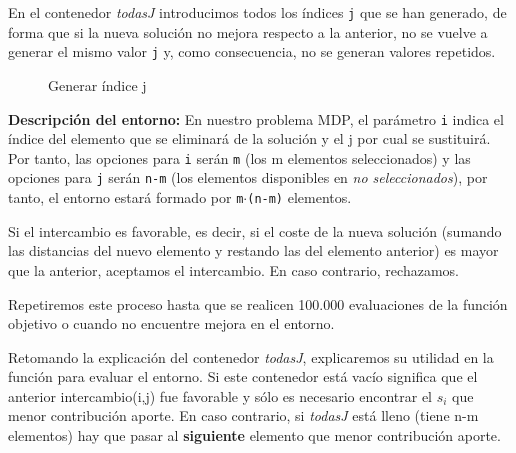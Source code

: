 \begin{enumerate}
	En el contenedor \textit{todasJ} introducimos todos los índices \texttt{j} que se han generado, de forma que si la nueva solución no mejora respecto a la anterior, no se vuelve a generar el mismo valor \texttt{j} y, como consecuencia, no se generan valores repetidos. 
	
	


\begin{figure}[H]
	\centering
	\begin{minipage}{.7\linewidth}
		
	\begin{algorithm}[H] 


		\caption{Generar índice j}
		\SetAlgoLined
		

		

	\end{algorithm}
		
	\end{minipage}
\end{figure}
	
	
	\newpage
	\textbf{Descripción del entorno:} 
	En nuestro problema MDP, el parámetro \texttt{i} indica el índice del elemento que se eliminará de la solución y el j por cual se sustituirá. Por tanto, las opciones para \texttt{i} serán \texttt{m} (los m elementos seleccionados) y las opciones para \texttt{j} serán \texttt{n-m} (los elementos disponibles en \textit{no seleccionados}), por tanto, el entorno estará formado por \texttt{m$\cdot$(n-m)} elementos.
	
	Si el intercambio es favorable, es decir, si el coste de la nueva solución (sumando las distancias del nuevo elemento y restando las del elemento anterior) es mayor que la anterior, aceptamos el intercambio. En caso contrario, rechazamos.
	
	Repetiremos este proceso hasta que se realicen 100.000 evaluaciones de la función objetivo o cuando no encuentre mejora en el entorno.
	
	
	Retomando la explicación del contenedor \textit{todasJ}, explicaremos su utilidad en la función para evaluar el entorno.
	Si este contenedor está vacío significa que el anterior intercambio(i,j) fue favorable y sólo es necesario encontrar el \textit{$s_i$} que menor contribución aporte.
	En caso contrario, si \textit{todasJ} está lleno (tiene n-m elementos) hay que pasar al \textbf{siguiente} elemento que menor contribución aporte.
	

\end{enumerate}
